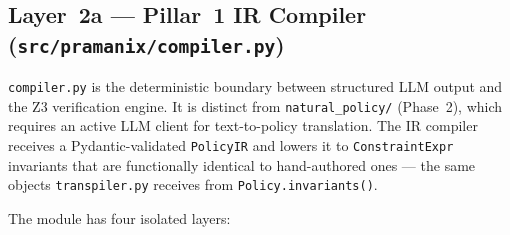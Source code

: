 \documentclass[12pt,a4paper,oneside]{report}
\newcommand{\fname}[1]{\texttt{#1}}          %
\newcommand{\code}[1]{\texttt{#1}}           %
\begin{document}
\subsection{Layer~2a --- Pillar~1 IR Compiler (\fname{src/pramanix/compiler.py})}

\fname{compiler.py} is the deterministic boundary between structured LLM
output and the Z3 verification engine.  It is distinct from
\fname{natural\_policy/} (Phase~2), which requires an active LLM client for
text-to-policy translation.  The IR compiler receives a Pydantic-validated
\code{PolicyIR} and lowers it to \code{ConstraintExpr} invariants that are
functionally identical to hand-authored ones --- the same objects
\fname{transpiler.py} receives from \code{Policy.invariants()}.

The module has four isolated layers:
\end{document}
